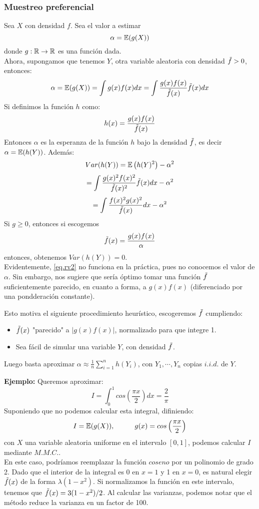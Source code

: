 \subsubsection{Muestreo preferencial}
Sea $X$ con densidad $f$. Sea el valor a estimar
\[\alpha = \mathbb E(g(X))\]
donde $g:\mathbb R\rightarrow\mathbb R$ es una función dada.\\ \newline
Ahora, supongamos que tenemos $Y$, otra variable aleatoria con densidad $\Tilde{f}>0$, entonces:
\[\alpha = \mathbb E(g(X)) = \int g(x)f(x) dx = \int \frac{g(x)f(x)}{\Tilde{f}(x)}\Tilde{f}(x) dx \]
Si definimos la función $h$ como:
\[h(x) = \frac{g(x)f(x)}{\Tilde{f}(x)}\]
Entonces $\alpha$ es la esperanza de la función $h$ bajo la densidad $\Tilde{f}$, es decir $\alpha = \mathbb E(h(Y))$. Además:
\[Var(h(Y)) = \mathbb E\left(h(Y)^2\right) - \alpha^2\]
\[= \int \frac{g(x)^2f(x)^2}{\Tilde{f}(x)^2}\Tilde{f}(x)dx - \alpha^2\]
\[= \int \frac{f(x)^2g(x)^2}{\Tilde{f}(x)}dx - \alpha^2\]
Si $g\geq 0$, entonces si escogemos \begin{equation}
    \Tilde{f}(x) = \frac{g(x)f(x)}{\alpha}
    \label{eq.rv2}
\end{equation}
entonces, obtenemos $Var(h(Y)) = 0$.\\ Evidentemente, \ref{eq.rv2} no funciona en la práctica, pues no conocemos el valor de $\alpha$. Sin embargo, nos sugiere que sería óptimo tomar una función $\Tilde{f}$ suficientemente parecido, en cuanto a forma, a $g(x)f(x)$ (diferenciado por una pondderación constante).\\ \newline

Esto motiva el siguiente procedimiento heurístico, escogeremos $\Tilde{f}$ cumpliendo:
\begin{itemize}
    \item $\Tilde{f}(x)$ "parecido" a $|g(x)f(x)|$, normalizado para que integre 1.
    \item Sea fácil de simular una variable $Y$, con densidad $\Tilde{f}$.
\end{itemize}
Luego basta aproximar $\alpha \approx \frac{1}{n}\sum_{i=1}^n h(Y_i)$, con $Y_1,\cdots,Y_n$ copias $i.i.d.$ de $Y$.\\ \newline

\textbf{Ejemplo: }Queremos aproximar:
\[I = \int_{0}^1 cos\left(\frac{\pi x}{2}\right)dx = \frac{2}{\pi}\]
Suponiendo que no podemos calcular esta integral, difiniendo:
\[I = \mathbb E(g(X)),\hspace{1cm}g(x) = cos\left(\frac{\pi x}{2}\right)\]
con $X$ una variable aleatoria uniforme en el intervalo $[0,1]$, podemos calcular $I$ mediante $M.M.C.$.\\ \newline
En este caso, podríamos reemplazar la función $coseno$ por un polinomio de grado 2. Dado que el interior de la integral es 0 en $x=1$ y 1 en $x=0$, es natural elegir $\Tilde{f}(x)$ de la forma $\lambda(1-x^2)$. Si normalizamos la función en este intervalo, tenemos que $\Tilde{f}(x) = 3(1-x^2)/2$. Al calcular las varianzas, podemos notar que el método reduce la varianza en un factor de 100. \\

